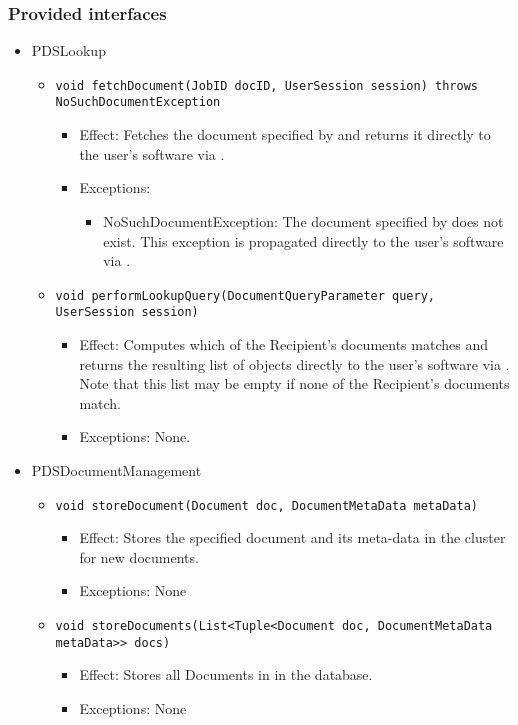 \subsubsection*{Provided interfaces}
\begin{itemize}
    \item PDSLookup
	\begin{itemize}
		\item \texttt{void fetchDocument(JobID docID, UserSession session) throws NoSuchDocumentException}
		\begin{itemize}
			\item Effect: Fetches the document specified by  and returns it directly to the user's software via .
			\item Exceptions:
			\begin{itemize}
				\item NoSuchDocumentException: The document specified by  does not exist. This exception is propagated directly to the user's software via .
			\end{itemize}
		\end{itemize}
				
		\item \texttt{void performLookupQuery(DocumentQueryParameter query, UserSession session)}
		\begin{itemize}
			\item Effect: Computes which of the Recipient's documents matches  and returns the resulting list of  objects directly to the user's software via . Note that this list may be empty if none of the Recipient's documents match.
			\item Exceptions: None.
		\end{itemize}
	\end{itemize}

    \item PDSDocumentManagement
	\begin{itemize}
		\item \texttt{void storeDocument(Document doc, DocumentMetaData metaData)}
		\begin{itemize}
			\item Effect: Stores the specified document and its meta-data in the cluster for new documents.
			\item Exceptions: None
		\end{itemize}

		\item \texttt{void storeDocuments(List<Tuple<Document doc, DocumentMetaData metaData>> docs)}
		\begin{itemize}
			\item Effect: Stores all Documents in  in the database.
			\item Exceptions: None
		\end{itemize}


\end{itemize}
\end{itemize}
